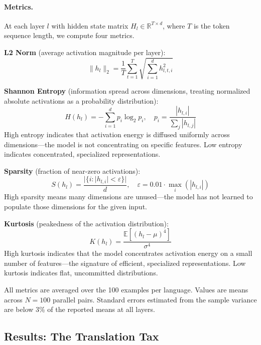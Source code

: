 \documentclass[11pt]{article}
\begin{document}
\paragraph{Metrics.}
At each layer $l$ with hidden state matrix $H_l \in \mathbb{R}^{T \times d}$, where $T$ is the token sequence length, we compute four metrics.

\textbf{L2 Norm} (average activation magnitude per layer):
\begin{equation}
\|h_l\|_2 = \frac{1}{T} \sum_{t=1}^{T} \sqrt{\sum_{i=1}^{d} h_{l,t,i}^2}
\end{equation}

\textbf{Shannon Entropy} (information spread across dimensions, treating normalized absolute activations as a probability distribution):
\begin{equation}
H(h_l) = -\sum_{i=1}^{d} p_i \log_2 p_i, \quad p_i = \frac{|h_{l,i}|}{\sum_j |h_{l,j}|}
\end{equation}
High entropy indicates that activation energy is diffused uniformly across dimensions---the model is not concentrating on specific features.
Low entropy indicates concentrated, specialized representations.

\textbf{Sparsity} (fraction of near-zero activations):
\begin{equation}
S(h_l) = \frac{|\{i : |h_{l,i}| < \varepsilon\}|}{d}, \quad \varepsilon = 0.01 \cdot \max_i(|h_{l,i}|)
\end{equation}
High sparsity means many dimensions are unused---the model has not learned to populate those dimensions for the given input.

\textbf{Kurtosis} (peakedness of the activation distribution):
\begin{equation}
K(h_l) = \frac{\mathbb{E}\left[(h_l - \mu)^4\right]}{\sigma^4}
\end{equation}
High kurtosis indicates that the model concentrates activation energy on a small number of features---the signature of efficient, specialized representations.
Low kurtosis indicates flat, uncommitted distributions.

All metrics are averaged over the 100 examples per language.
Values are means across $N=100$ parallel pairs.
Standard errors estimated from the sample variance are below 3\% of the reported means at all layers.

\subsection{Results: The Translation Tax}
\label{sec:translation-tax}
\end{document}
